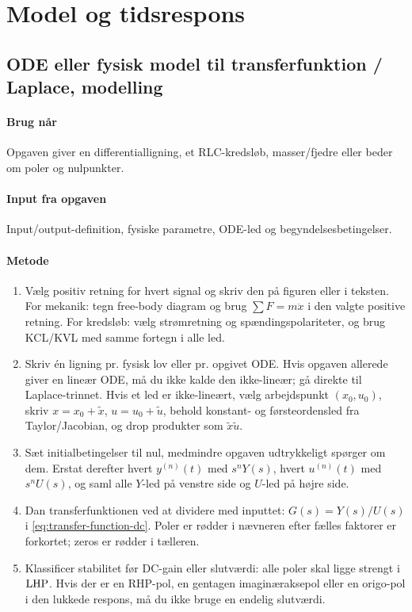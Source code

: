 \section{Model og tidsrespons}
\label{sec:model}

\subsection{ODE eller fysisk model til transferfunktion / Laplace, modelling}

\paragraph{Brug når}
Opgaven giver en differentialligning, et RLC-kredsløb, masser/fjedre eller beder om
poler og nulpunkter.

\paragraph{Input fra opgaven}
Input/output-definition, fysiske parametre, ODE-led og begyndelsesbetingelser.

\paragraph{Metode}
\begin{enumerate}
\item Vælg positiv retning for hvert signal og skriv den på figuren eller i teksten.
      For mekanik: tegn free-body diagram og brug \(\sum F=m\ddot x\) i den valgte
      positive retning. For kredsløb: vælg strømretning og spændingspolariteter, og brug
      KCL/KVL med samme fortegn i alle led.
\item Skriv én ligning pr. fysisk lov eller pr. opgivet ODE. Hvis opgaven allerede giver
      en lineær ODE, må du ikke kalde den ikke-lineær; gå direkte til Laplace-trinnet.
      Hvis et led er ikke-lineært, vælg arbejdspunkt \((x_0,u_0)\), skriv
      \(x=x_0+\tilde x\), \(u=u_0+\tilde u\), behold konstant- og førsteordensled fra
      Taylor/Jacobian, og drop produkter som \(\tilde x\tilde u\).
\item Sæt initialbetingelser til nul, medmindre opgaven udtrykkeligt spørger om dem.
      Erstat derefter hvert \(y^{(n)}(t)\) med \(s^nY(s)\), hvert \(u^{(n)}(t)\) med
      \(s^nU(s)\), og saml alle \(Y\)-led på venstre side og \(U\)-led på højre side.
\item Dan transferfunktionen ved at dividere med inputtet: \(G(s)=Y(s)/U(s)\) i
      \eqref{eq:transfer-function-dc}. Poler er rødder i nævneren efter fælles faktorer
      er forkortet; zeros er rødder i tælleren.
\item Klassificer stabilitet før DC-gain eller slutværdi: alle poler skal ligge strengt
      i \(\mathrm{LHP}\). Hvis der er en RHP-pol, en gentagen imaginæraksepol eller en origo-pol
      i den lukkede respons, må du ikke bruge en endelig slutværdi.
\end{enumerate}

